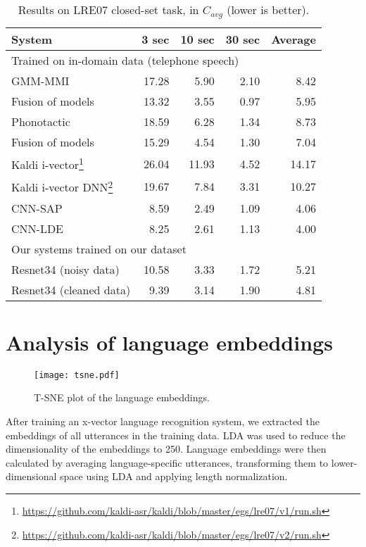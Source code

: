 \documentclass{article}
\begin{document}
\begin{table}[tb]
\caption{Results on LRE07  closed-set task, in $C_{avg}$ (lower is better).  }
\label{tab:lre07}
\centering
\begin{tabular}{lrrrr}
\hline
System & 3 sec & 10 sec & 30 sec & Average \\
\hline
\multicolumn{5}{l}{Trained on in-domain data (telephone speech)} \\
\hline
GMM-MMI \cite{torres2008mitll} & 17.28 & 5.90 & 2.10 & 8.42 \\
Fusion of models \cite{torres2008mitll} & 13.32 &  3.55 & 0.97 & 5.95 \\
Phonotactic \cite{gelly2016divide} & 18.59 & 6.28 & 1.34 & 8.73 \\
Fusion of models \cite{gelly2016divide} & 15.29 & 4.54 & 1.30 & 7.04 \\
Kaldi i-vector\footnote{\url{https://github.com/kaldi-asr/kaldi/blob/master/egs/lre07/v1/run.sh}}  & 26.04 &  11.93 &  4.52  & 14.17  \\
Kaldi i-vector DNN\footnote{\url{https://github.com/kaldi-asr/kaldi/blob/master/egs/lre07/v2/run.sh}}  & 19.67  & 7.84  & 3.31 & 10.27  \\
CNN-SAP \cite{cai2018exploring} & 8.59 & 2.49 & 1.09 & 4.06  \\
CNN-LDE \cite{cai2018exploring} & 8.25 & 2.61 & 1.13 & 4.00 \\
\hline
\multicolumn{5}{l}{Our systems trained on our dataset} \\
\hline
Resnet34 (noisy data)   & 10.58 & 3.33 & 1.72 & 5.21 \\
Resnet34 (cleaned data) & 9.39 & 3.14 & 1.90 & 4.81 \\
\hline
\end{tabular}
\end{table}


\section{Analysis of language embeddings}


\begin{figure*}[tbh]
  \centering
  \texttt{[image: tsne.pdf]}
  \caption{T-SNE plot of the language embeddings.}
  \label{fig:tsne}
\end{figure*}

After training an x-vector language recognition system, we extracted the embeddings of all utterances in the training data. LDA was used to reduce the dimensionality of the embeddings to 250. Language embeddings were then calculated by averaging language-specific utterances, transforming them to lower-dimensional space using LDA and applying length normalization.
\end{document}
